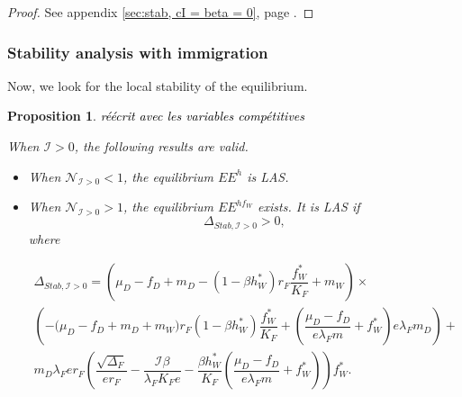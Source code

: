 \documentclass{article}
\newcommand{\lfw}{\lambda_{F}}
\newcommand{\lfw}{\lambda_{F}}
\newcommand{\cI}{\mathcal{I}}
\newcommand{\vdeux}[1]{\textcolor{black}{#1}}
\newtheorem{prop}[theorem]{Proposition}
\theoremstyle{definition}
\theoremstyle{remark}
\begin{document}
\begin{proof}
See appendix \ref{sec:stab, cI = beta = 0}, page \pageref{sec:stab, cI = beta = 0}.
\end{proof}


\subsubsection{Stability analysis with immigration}
Now, we look for the local stability of the equilibrium.
\begin{prop}\label{prop:stab, cI>0} 
\vdeux{réécrit avec les variables compétitives}

When $\cI > 0$, the following results are valid.
\begin{itemize}
\item When $\mathcal{N}_{\cI > 0} < 1$, the equilibrium $EE^{h}$ is LAS.
\item When $\mathcal{N}_{\cI > 0} > 1$, the equilibrium $EE^{hf_W}$  exists. It is LAS if 
$$\Delta_{Stab, \cI > 0} > 0,$$  where 

\begin{multline}
\Delta_{Stab, \cI > 0} = \left(\mu_D -f_D + m_D - (1 - \beta h_W^*)r_F \dfrac{f_W^*}{K_F} + m_W  \right) \times \\ \left(- \big( \mu_D  -f_D + m_D + m_W) r_F(1 - \beta h_W^*) \dfrac{f^*_W}{K_F} + \left(\dfrac{\mu_D -f_D}{e\lfw m} + f_W^*\right) e \lfw m_D \right) + \\
m_D \lfw e r_F \left(\dfrac{\sqrt{\Delta_F}}{er_F} - \dfrac{\cI \beta}{\lfw K_F e} - \dfrac{\beta h_W^*}{K_F} \left(\dfrac{\mu_D -f_D }{e \lfw m} + f_W^*\right)\right)  f^*_{W}.
\label{eq:deltaStab, I>0}
\end{multline}
\end{itemize}
\end{prop}
\end{document}
